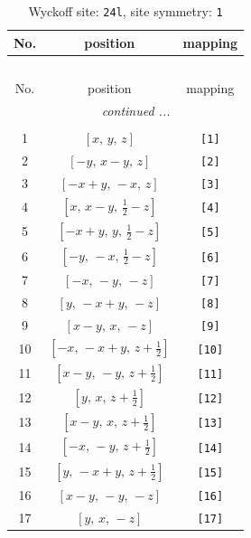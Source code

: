 \documentclass[fleqn,8pt]{jsarticle}
\begin{document}
\begin{longtable}{ccc}
\caption{Wyckoff site: {\tt 24l}, site symmetry: {\tt 1}}
 \\
 \hline \hline
No. & position & mapping \\ \hline \endfirsthead

\multicolumn{2}{l}{\tablename\ \thetable{}} \\
 \hline \hline
No. & position & mapping \\ \hline \endhead

 \hline \hline
\multicolumn{2}{r}{\footnotesize\it continued ...} \\ \endfoot

 \hline \hline
\multicolumn{2}{r}{} \\ \endlastfoot

1 & $\left[ x,\, y,\, z \right]$ & {\tt [1]} \\ \hline
2 & $\left[ - y,\, x - y,\, z \right]$ & {\tt [2]} \\ \hline
3 & $\left[ - x + y,\, - x,\, z \right]$ & {\tt [3]} \\ \hline
4 & $\left[ x,\, x - y,\, \frac{1}{2} - z \right]$ & {\tt [4]} \\ \hline
5 & $\left[ - x + y,\, y,\, \frac{1}{2} - z \right]$ & {\tt [5]} \\ \hline
6 & $\left[ - y,\, - x,\, \frac{1}{2} - z \right]$ & {\tt [6]} \\ \hline
7 & $\left[ - x,\, - y,\, - z \right]$ & {\tt [7]} \\ \hline
8 & $\left[ y,\, - x + y,\, - z \right]$ & {\tt [8]} \\ \hline
9 & $\left[ x - y,\, x,\, - z \right]$ & {\tt [9]} \\ \hline
10 & $\left[ - x,\, - x + y,\, z + \frac{1}{2} \right]$ & {\tt [10]} \\ \hline
11 & $\left[ x - y,\, - y,\, z + \frac{1}{2} \right]$ & {\tt [11]} \\ \hline
12 & $\left[ y,\, x,\, z + \frac{1}{2} \right]$ & {\tt [12]} \\ \hline
13 & $\left[ x - y,\, x,\, z + \frac{1}{2} \right]$ & {\tt [13]} \\ \hline
14 & $\left[ - x,\, - y,\, z + \frac{1}{2} \right]$ & {\tt [14]} \\ \hline
15 & $\left[ y,\, - x + y,\, z + \frac{1}{2} \right]$ & {\tt [15]} \\ \hline
16 & $\left[ x - y,\, - y,\, - z \right]$ & {\tt [16]} \\ \hline
17 & $\left[ y,\, x,\, - z \right]$ & {\tt [17]} \\ \hline

\end{longtable}
\end{document}
